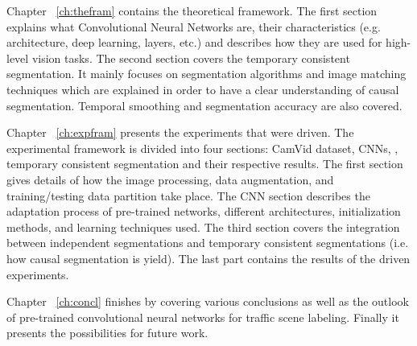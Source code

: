 Chapter ~\ref{ch:thefram} contains the theoretical framework. The first section explains what Convolutional Neural Networks are, their characteristics (e.g. architecture, deep learning, layers, etc.) and describes how they are used for high-level vision tasks. The second section covers the temporary consistent segmentation. It mainly focuses on segmentation algorithms and image matching techniques which are explained in order to have a clear understanding of causal segmentation. Temporal smoothing and segmentation accuracy are also covered. 

Chapter ~\ref{ch:expfram} presents the experiments that were driven. The experimental framework is divided into four sections: CamVid dataset, CNNs, , temporary consistent segmentation and their respective results. The first section gives details of how the image processing, data augmentation, and training/testing data partition take place. The CNN section describes the adaptation process of pre-trained networks, different architectures, initialization methods, and learning techniques used.  The third section covers the integration between independent segmentations and temporary consistent segmentations (i.e. how causal segmentation is yield). The last part contains the results of the driven experiments. 

Chapter ~\ref{ch:concl} finishes by covering various conclusions as well as the outlook of pre-trained convolutional neural networks for traffic scene labeling. Finally it presents the possibilities for future work.








